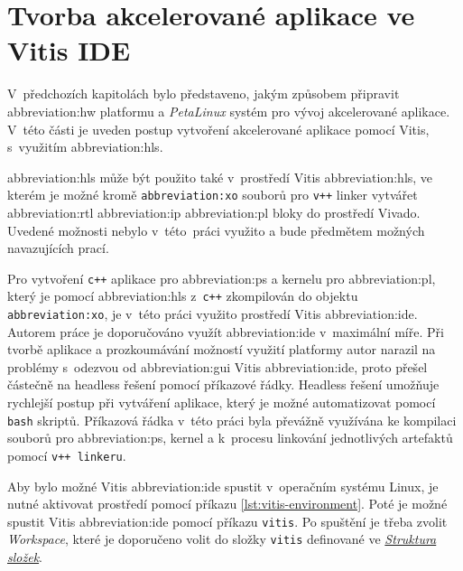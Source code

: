 \documentclass[a4paper, twoside, 11pt]{article}
\newcommand{\fbar}{\FloatBarrier}
\begin{document}
	\section{Tvorba akcelerované aplikace ve Vitis IDE}
	V~předchozích kapitolách bylo představeno, jakým způsobem připravit \gls{abbreviation:hw} platformu a \textit{PetaLinux} systém pro vývoj akcelerované aplikace. V~této části je uveden postup vytvoření akcelerované aplikace pomocí Vitis, s~využitím \gls{abbreviation:hls}.\par
	\gls{abbreviation:hls} může být použito také v~prostředí Vitis \gls{abbreviation:hls}, ve kterém je možné kromě \texttt{\gls{abbreviation:xo}} souborů pro \texttt{v++} linker vytvářet \gls{abbreviation:rtl} \gls{abbreviation:ip} \gls{abbreviation:pl} bloky do prostředí Vivado. Uvedené možnosti nebylo v~této~práci využito a bude předmětem možných navazujících prací.\par
	Pro vytvoření \texttt{c++} aplikace pro \gls{abbreviation:ps} a kernelu pro \gls{abbreviation:pl}, který je pomocí \gls{abbreviation:hls} z~\texttt{c++} zkompilován do objektu \texttt{\gls{abbreviation:xo}}, je v~této práci využito prostředí Vitis \gls{abbreviation:ide}. Autorem práce je doporučováno využít \gls{abbreviation:ide} v~maximální míře. Při tvorbě aplikace a prozkoumávání možností využití platformy autor narazil na problémy s~odezvou od \gls{abbreviation:gui} Vitis \gls{abbreviation:ide}, proto přešel částečně na headless řešení pomocí příkazové řádky. Headless řešení umožňuje rychlejší postup při vytváření aplikace, který je možné automatizovat pomocí \texttt{bash} skriptů. Příkazová řádka v~této práci byla převážně využívána ke kompilaci souborů pro \gls{abbreviation:ps}, kernel a k~procesu linkování jednotlivých artefaktů pomocí \texttt{v++ linkeru}.\par
	Aby bylo možné Vitis \gls{abbreviation:ide} spustit v~operačním systému Linux, je nutné aktivovat prostředí pomocí příkazu \ref{lst:vitis-environment}. Poté je možné spustit Vitis \gls{abbreviation:ide} pomocí příkazu \texttt{vitis}. Po spuštění je třeba zvolit \textit{Workspace}, které je doporučeno volit do složky \texttt{vitis} definované ve \hyperref[sec:struktura-slozek]{\textit{Struktura složek}}.\par

		\fbar
\end{document}
